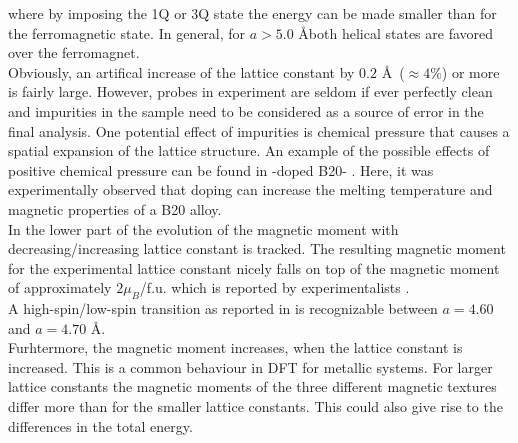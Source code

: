 \documentclass [a4paper, 12pt]{article}
\begin{document}
where by imposing the 1Q or 3Q state the energy can be made smaller than for the ferromagnetic state.
In general, for $a>5.0$ \AA both helical states are favored over the ferromagnet.
\\
Obviously, an artifical increase of the lattice constant by
$0.2$ \AA \, ($\approx 4 \%$) or more is fairly large.
However, probes in experiment are seldom if ever perfectly clean and
impurities in the sample need to be considered as a source of error in the
final analysis. One potential
effect of impurities is chemical pressure that causes a spatial expansion of the
lattice structure.
An example of the possible effects of positive chemical pressure
can be found in -doped B20- \cite{stolt_chemical_2018}. 
Here, it was experimentally observed
that doping can increase the melting temperature and magnetic properties of a B20 alloy.
\\
In the lower part of  the evolution of the magnetic moment
with decreasing/increasing lattice constant is tracked.
The resulting magnetic moment for the experimental lattice constant nicely falls 
on top of the magnetic moment of approximately $2 \mu_{B}$/f.u. 
which is reported by experimentalists \cite{yaouanc_magnetic_2017}.
\\
A high-spin/low-spin transition as reported in \cite{rosler_ab_2012}
is recognizable between $a=4.60$ and $a=4.70$ \AA.
\\
Furhtermore, the magnetic moment increases, when the lattice constant is increased.
This is a common behaviour in DFT for metallic systems.
For larger lattice constants the magnetic moments of the three different
magnetic textures differ more than for the smaller lattice constants.
This could also give rise to the differences in the total energy.
\end{document}
